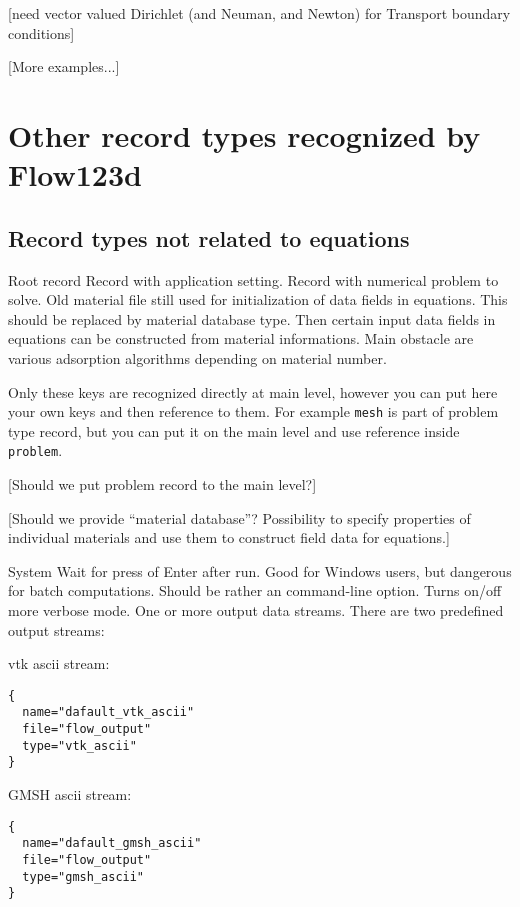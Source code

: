 [need vector valued Dirichlet (and Neuman, and Newton) for Transport boundary conditions]

[More examples...]


\section{Other record types recognized by Flow123d}

\subsection{Record types not related to equations}

\begin{recordtype}{Root record}{}
  Record with application setting.
  Record with numerical problem to solve. 
    Old material file still used for initialization of data fields in equations. 
    This should be replaced by material database type. Then certain input data fields in equations can be 
    constructed from material informations. Main obstacle are various adsorption algorithms depending on material number.
\end{recordtype}

Only these  keys are recognized directly at main level, however you can put here your own keys and then reference
to them. For example \verb'mesh' is part of problem type record, but you can put it on the main level and use reference 
inside \verb'problem'. 

[Should we put problem record to the main level?]

[Should we provide ``material database''? Possibility to specify properties of individual materials and use them to construct
 field data for equations.]

\begin{recordtype}{System}{}
Wait for press of Enter after run. Good for Windows users, but dangerous for batch computations. 
Should be rather an command-line option.
Turns on/off more verbose mode. 
One or more output data streams.
There are two predefined output streams:


vtk ascii stream:
\begin{verbatim}
{
  name="dafault_vtk_ascii"
  file="flow_output"
  type="vtk_ascii"
}
\end{verbatim}

GMSH ascii stream:
\begin{verbatim}
{
  name="dafault_gmsh_ascii"
  file="flow_output"
  type="gmsh_ascii"
}
\end{verbatim}

\end{recordtype}


